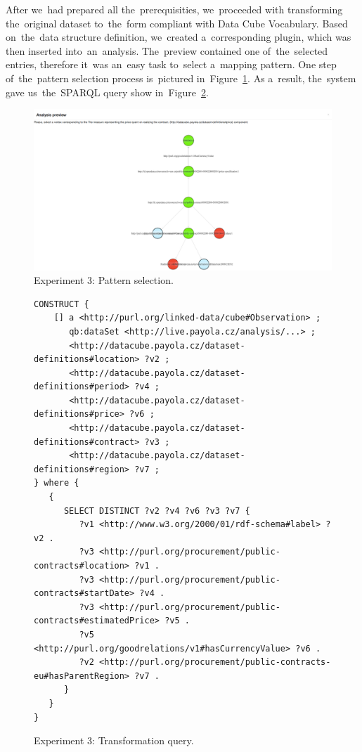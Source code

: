 After we~had prepared all the~prerequisities, we~proceeded with transforming the~original dataset to~the~form compliant with Data Cube Vocabulary. Based on~the~data structure definition, we~created a~corresponding plugin, which was then 
inserted into~an~analysis. The~preview contained one of~the~selected entries, 
therefore it~was an~easy task to~select a~mapping pattern. One step of~the~pattern selection process is~pictured in~Figure~\ref{fig:contracts-pattern}.
As a~result, the~system gave us~the~SPARQL query show in~Figure~\ref{fig:contracts-query-pattern}.

\begin{figure}
  \centering
  \includegraphics[width=140mm]{img/contracts-pattern.png}
  \caption{Experiment 3: Pattern selection.}
  \label{fig:contracts-pattern}
\end{figure}

\begin{figure}
  \scriptsize
  \begin{verbatim}
CONSTRUCT {
    [] a <http://purl.org/linked-data/cube#Observation> ;
       qb:dataSet <http://live.payola.cz/analysis/...> ;
       <http://datacube.payola.cz/dataset-definitions#location> ?v2 ;
       <http://datacube.payola.cz/dataset-definitions#period> ?v4 ;
       <http://datacube.payola.cz/dataset-definitions#price> ?v6 ;
       <http://datacube.payola.cz/dataset-definitions#contract> ?v3 ;
       <http://datacube.payola.cz/dataset-definitions#region> ?v7 ;
} where {
   {
      SELECT DISTINCT ?v2 ?v4 ?v6 ?v3 ?v7 {
         ?v1 <http://www.w3.org/2000/01/rdf-schema#label> ?v2 .
         ?v3 <http://purl.org/procurement/public-contracts#location> ?v1 .
         ?v3 <http://purl.org/procurement/public-contracts#startDate> ?v4 .
         ?v3 <http://purl.org/procurement/public-contracts#estimatedPrice> ?v5 .
         ?v5 <http://purl.org/goodrelations/v1#hasCurrencyValue> ?v6 .
         ?v2 <http://purl.org/procurement/public-contracts-eu#hasParentRegion> ?v7 .
      }
   }
} 
  \end{verbatim}
  \caption{Experiment 3: Transformation query.}
  \label{fig:contracts-query-pattern}
\end{figure}

